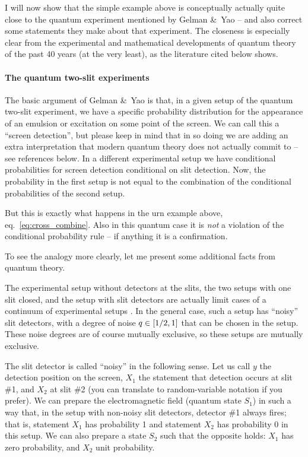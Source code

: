 \documentclass[\ifafour a4paper,12pt,\else a5paper,10pt,\fi%
onecolumn,oneside,article,%
british%
]{memoir}
\theoremstyle{remark}
\theoremstyle{innote}
\newcommand*{\citep}{\parencites}%
\newcommand*{\amp}{\&}
\DeclarePairedDelimiter\clcl{[}{]}
\renewcommand*{\|}[1][]{\nonscript\,#1\vert\nonscript\;\mathopen{}}
\newcommand*{\eqn}{eq.}%
\newcommand*{\yxa}{X_{1}}
\newcommand*{\yxb}{X_{2}}
\begin{document}
I will now show that the simple example above is conceptually actually
quite close to the quantum experiment mentioned by Gelman \amp\ Yao -- and
also correct some statements they make about that experiment. The closeness
is especially clear from the experimental and mathematical developments of
quantum theory of the past 40 years (at the very least), as the literature
cited below shows.

\bigskip

\paragraph{The quantum two-slit experiments}

The basic argument of Gelman \amp\ Yao is that, in a given setup of the
quantum two-slit experiment, we have a specific probability distribution
for the appearance of an emulsion or excitation on some point of the
screen. We can call this a \enquote{screen detection}, but please keep in
mind that in so doing we are adding an extra interpretation that modern
quantum theory does not actually commit to -- see references below. In a
different experimental setup we have conditional probabilities for screen
detection conditional on slit detection. Now, the probability in the first
setup is not equal to the combination of the conditional probabilities of
the second setup.

But this is exactly what happens in the urn example above,
\eqn~\eqref{eq:cross_combine}. Also in this quantum case it is \emph{not} a
violation of the conditional probability rule -- if anything it is a
confirmation.

To see the analogy more clearly, let me present some additional facts from
quantum theory.

\medskip

The experimental setup without detectors at the slits, the two setups with
one slit closed, and the setup with slit detectors are actually limit cases
of a continuum of experimental setups \citep{woottersetal1979}[for a recent
review and further references see]{banaszeketal2013}. In the general case,
such a setup has \enquote{noisy} slit detectors, with a degree of noise
$q \in \clcl{1/2, 1}$ that can be chosen in the setup. These noise degrees
are of course mutually exclusive, so these setups are mutually exclusive.

The slit detector is called \enquote{noisy} in the following sense. Let us
call $y$ the detection position on the screen, $\yxa$ the statement that
detection occurs at slit \#1, and $\yxb$ at slit \#2 (you can translate to
random-variable notation if you prefer). We can prepare the electromagnetic
field (quantum state $S_{1}$) in such a way that, in the setup with
non-noisy slit detectors, detector \#1 always fires; that is, statement
$\yxa$ has probability 1 and statement $\yxb$ has probability 0 in this
setup. We can also prepare a state $S_{2}$ such that the opposite holds:
$\yxa$ has zero probability, and $\yxb$ unit probability.
\end{document}
